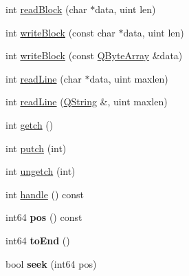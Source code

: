 \begin{DoxyCompactItemize}
\item 
int \mbox{\hyperlink{class_q_file_ab9a42e65a2fcd51bae5f2a186ff5bee5}{read\+Block}} (char $\ast$data, uint len)
\item 
int \mbox{\hyperlink{class_q_file_a47e0572e396a6e953d14ba69bf733cea}{write\+Block}} (const char $\ast$data, uint len)
\item 
int \mbox{\hyperlink{class_q_file_a04e15f86aa48622ddb7c7e81c7cc7613}{write\+Block}} (const \mbox{\hyperlink{class_q_array}{Q\+Byte\+Array}} \&data)
\item 
int \mbox{\hyperlink{class_q_file_af95c756ce6ff9f597ff1d21c8384d777}{read\+Line}} (char $\ast$data, uint maxlen)
\item 
int \mbox{\hyperlink{class_q_file_a324c017d391658a8eacf5b35932f5f87}{read\+Line}} (\mbox{\hyperlink{class_q_string}{Q\+String}} \&, uint maxlen)
\item 
int \mbox{\hyperlink{class_q_file_a1c18e1a16e6f92ba8f19177824707f78}{getch}} ()
\item 
int \mbox{\hyperlink{class_q_file_af331c4e27024f12383958e65c6a828a3}{putch}} (int)
\item 
int \mbox{\hyperlink{class_q_file_afb01a04cda09b3cc61babb5d334a052c}{ungetch}} (int)
\item 
int \mbox{\hyperlink{class_q_file_a79e6ed6f6cbb283332fefd0805fbafe7}{handle}} () const
\item 
\mbox{\label{class_q_file_ab101d0dfcee571bfff4f305d89ab98ea}} 
int64 {\bfseries pos} () const
\item 
\mbox{\label{class_q_file_af5a806623250b78c5aa02a10b16effc7}} 
int64 {\bfseries to\+End} ()
\item 
\mbox{\label{class_q_file_affb1708c3feb5bb734f4486a7bcced1a}} 
bool {\bfseries seek} (int64 pos)
\end{DoxyCompactItemize}
